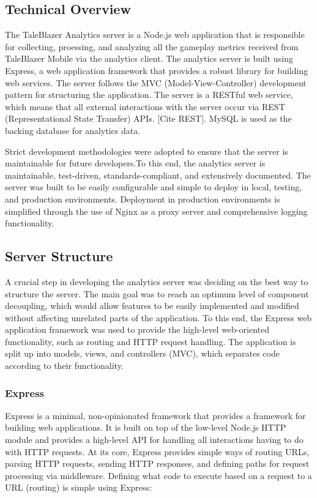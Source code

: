 \subsection{Technical Overview}

The TaleBlazer Analytics server is a Node.js web application that is responsible for collecting, proessing, and analyzing all the gameplay metrics received from TaleBlazer Mobile via the analytics client. The analytics server is built using Express, a web application framework that provides a robust library for building web services. The server follows the MVC (Model-View-Controller) development pattern for structuring the application. The server is a RESTful web service, which means that all external interactions with the server occur via REST (Representational State Transfer) APIs. [Cite REST]. MySQL is used as the backing database for analytics data.

Strict development methodologies were adopted to ensure that the server is maintainable for future developers.To this end, the analytics server is maintainable, test-driven, standards-compliant, and extensively documented. The server was built to be easily configurable and simple to deploy in local, testing, and production environments. Deployment in production environments is simplified through the use of Nginx as a proxy server and comprehensive logging functionality.

\subsection{Server Structure}

A crucial step in developing the analytics server was deciding on the best way to structure the server. The main goal was to reach an optimum level of component decoupling, which would allow features to be easily implemented and modified without affecting unrelated parts of the application. To this end, the Express web application framework was used to provide the high-level web-oriented functionality, such as routing and HTTP request handling. The application is split up into models, views, and controllers (MVC), which separates code according to their functionality. 

\subsubsection{Express}
Express is a minimal, non-opinionated framework that provides a framework for building web applications. It is built on top of the low-level Node.js HTTP module and provides a high-level API for handling all interactions having to do with HTTP requests. At its core, Express provides simple ways of routing URLs, parsing HTTP requests, sending HTTP responses, and defining paths for request processing via middleware. Defining what code to execute based on a request to a URL (routing) is simple using Express:

